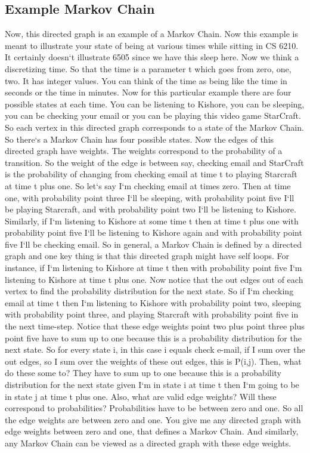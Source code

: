 \subsection{Example  Markov Chain}
Now, this directed graph is an example of a Markov Chain.
Now this example is meant to illustrate your state of being at various times while sitting in CS 6210.
It certainly doesn`t illustrate 6505 since we have this sleep here.
Now we think a discretizing time.
So that the time is a parameter t which goes from zero, one, two.
It has integer values.
You can think of the time as being like the time in seconds or the time in minutes.
Now for this particular example there are four possible states at each time.
You can be listening to Kishore, you can be sleeping, you can be checking your email or you can be playing this video game StarCraft.
So each vertex in this directed graph corresponds to a state of the Markov Chain.
So there`s a Markov Chain has four possible states.
Now the edges of this directed graph have weights.
The weights correspond to the probability of a transition.
So the weight of the edge is between say, checking email and StarCraft is the probability of changing from checking email at time t to playing Starcraft at time t plus one.
So let`s say I`m checking email at times zero.
Then at time one, with probability point three I`ll be sleeping, with probability point five I`ll be playing Starcraft, and with probability point two I`ll be listening to Kishore.
Similarly, if I`m listening to Kishore at some time t then at time t plus one with probability point five I`ll be listening to Kishore again and with probability point five I`ll be checking email.
So in general, a Markov Chain is defined by a directed graph and one key thing is that this directed graph might have self loops.
For instance, if I`m listening to Kishore at time t then with probability point five I`m listening to Kishore at time t plus one.
Now notice that the out edges out of each vertex to find the probability distribution for the next state.
So if I`m checking email at time t then I`m listening to Kishore with probability point two, sleeping with probability point three, and playing Starcraft with probability point five in the next time-step.
Notice that these edge weights point two plus point three plus point five have to sum up to one because this is a probability distribution for the next state.
So for every state i, in this case i equals check e-mail, if I sum over the out edges, so I sum over the weights of these out edges, this is P(i,j).
Then, what do these some to? They have to sum up to one because this is a probability distribution for the next state given I`m in state i at time t then I`m going to be in state j at time t plus one.
Also, what are valid edge weights? Will these correspond to probabilities? Probabilities have to be between zero and one.
So all the edge weights are between zero and one.
You give me any directed graph with edge weights between zero and one, that defines a Markov Chain.
And similarly, any Markov Chain can be viewed as a directed graph with these edge weights.

